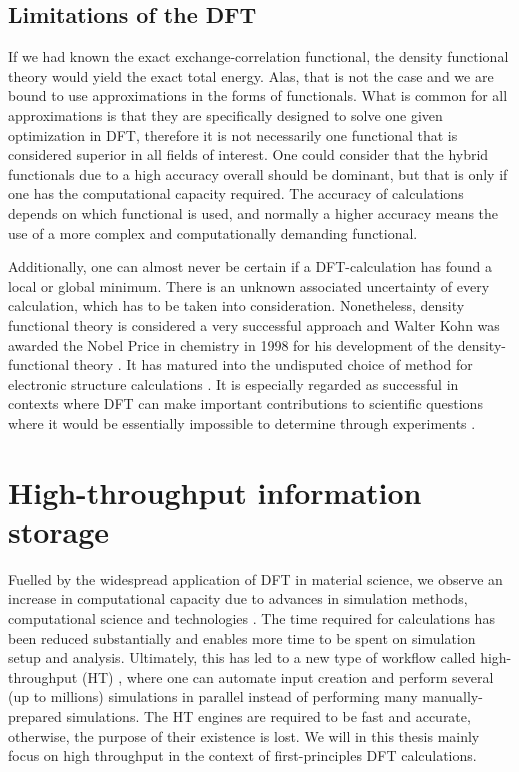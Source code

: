 \subsection{Limitations of the DFT}

If we had known the exact exchange-correlation functional, the density functional theory would yield the exact total energy. Alas, that is not the case and we are bound to use approximations in the forms of functionals. What is common for all approximations is that they are specifically designed to solve one given optimization in DFT, therefore it is not necessarily one functional that is considered superior in all fields of interest. One could consider that the hybrid functionals due to a high accuracy overall should be dominant, but that is only if one has the computational capacity required. The accuracy of calculations depends on which functional is used, and normally a higher accuracy means the use of a more complex and computationally demanding functional.

Additionally, one can almost never be certain if a DFT-calculation has found a local or global minimum. There is an unknown associated uncertainty of every calculation, which has to be taken into consideration. Nonetheless, density functional theory is considered a very successful approach and Walter Kohn was awarded the Nobel Price in chemistry in 1998 for his development of the density-functional theory \cite{Freitas1999}. It has matured into the undisputed choice of method for electronic structure calculations \cite{Schleder2019}. It is especially regarded as successful in contexts where DFT can make important contributions to scientific questions where it would be essentially impossible to determine through experiments \cite{DavidSholl2009}. %

\section{High-throughput information storage}


Fuelled by the widespread application of DFT in material science, we observe an increase in computational capacity due to advances in simulation methods, computational science and technologies \cite{Schleder2019}. The time required for calculations has been reduced substantially and enables more time to be spent on simulation setup and analysis. Ultimately, this has led to a new type of workflow called high-throughput (HT) \cite{Yang2017}, where one can automate input creation and perform several (up to millions) simulations in parallel instead of performing many manually-prepared simulations. The HT engines are required to be fast and accurate, otherwise, the purpose of their existence is lost. We will in this thesis mainly focus on high throughput in the context of first-principles DFT calculations.


